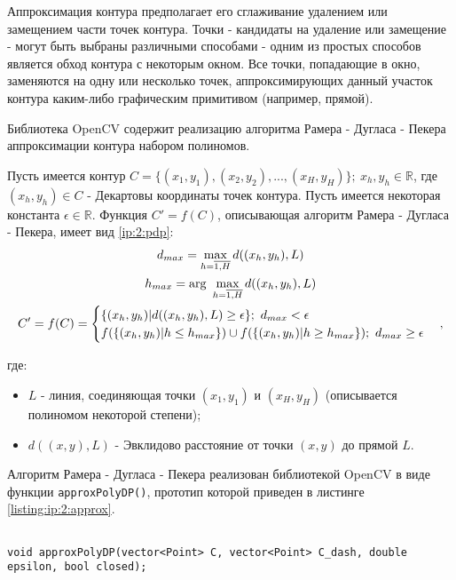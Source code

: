 

Аппроксимация контура предполагает его сглаживание удалением или замещением части точек контура. Точки - кандидаты на удаление или замещение - могут быть выбраны различными способами - одним из простых способов является обход контура с некоторым окном. Все точки, попадающие в окно, заменяются на одну или несколько точек, аппроксимирующих данный участок контура каким-либо графическим примитивом (например, прямой).

Библиотека OpenCV содержит реализацию алгоритма Рамера - Дугласа - Пекера аппроксимации контура набором полиномов.

Пусть имеется контур $C = \{(x_1, y_1), (x_2, y_2), ..., (x_H, y_H)\} ;~ x_h, y_h \in \mathbb{R}$, где $(x_h, y_h) \in C$ - Декартовы координаты точек контура. Пусть имеется некоторая константа $\epsilon \in \mathbb{R}$. Функция $C' = f(C)$, описывающая алгоритм Рамера - Дугласа - Пекера, имеет вид \eqref{ip:2:pdp}:
\begin{gather}
	\notag d_{max} = \max_{h = \overline{1, H}} d((x_h, y_h), L) \\
	\notag h_{max} = \arg ~ \max_{h = \overline{1, H}} d((x_h, y_h), L) \\
	\label{ip:2:pdp}
	C' = f(C) =
	\begin{cases}
		\{ (x_h, y_h) | d((x_h, y_h), L) \ge \epsilon \} ;~ d_{max} < \epsilon \\
		f(\{ (x_h, y_h) | h \le h_{max} \}) \cup f(\{ (x_h, y_h) | h \ge h_{max} \}) ;~  d_{max} \ge \epsilon 
	\end{cases},
\end{gather}

где:

\begin{itemize}

	\item $L$ - линия, соединяющая точки $(x_1, y_1)$ и $(x_H, y_H)$ (описывается полиномом некоторой степени);
	\item $d((x, y), L)$ - Эвклидово расстояние от точки $(x, y)$ до прямой $L$.

\end{itemize}

Алгоритм Рамера - Дугласа - Пекера реализован библиотекой OpenCV в виде функции \verb|approxPolyDP()|, прототип которой приведен в листинге \ref{listing:ip:2:approx}.

\begin{lstlisting}

void approxPolyDP(vector<Point> C, vector<Point> C_dash, double epsilon, bool closed);

\end{lstlisting}
\mylistingend

